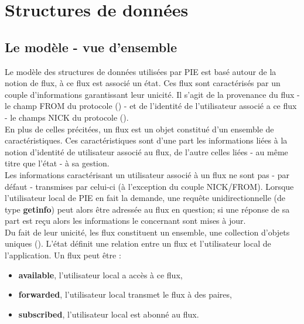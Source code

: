 

\section{Structures de données}
\label{section:storage}

\subsection{Le modèle - vue d'ensemble}

Le modèle des structures de données utilisées par PIE est basé autour de la notion de
flux, à ce flux est associé un état. Ces flux sont caractérisés par un couple d'informations
garantissant leur unicité. Il s'agit de la provenance du flux - le champ FROM du protocole
() - et de l'identité de l'utilisateur associé a ce flux - le champs NICK
du protocole ().\\

En plus de celles précitées, un flux est un objet constitué d'un ensemble de caractéristiques.
Ces caractéristiques sont d'une part les informations liées à la notion d'identité de utilisateur
associé au flux, de l'autre celles liées - au même titre que l'état - à sa gestion. \\

Les informations caractérisant un utilisateur associé à un flux ne sont pas - par défaut -
transmises par celui-ci (à l'exception du couple NICK/FROM). Lorsque 
l'utilisateur local de PIE en fait la demande, une requête unidirectionnelle (de type \textbf{getinfo})
peut alors être adressée au flux en question; si une réponse de sa part est reçu alors
les informations le concernant sont mises à jour. \\

Du fait de leur unicité, les flux constituent un ensemble, une collection d'objets uniques ().
L'état définit une relation entre un flux et l'utilisateur local de l'application. Un flux
peut être : \\

\begin{itemize}
	\item \textbf{available}, l'utilisateur local a accès à ce flux,
    \item \textbf{forwarded}, l'utilisateur local transmet le flux à des paires,
    \item \textbf{subscribed}, l'utilisateur local est abonné au flux. \\
\end{itemize}

